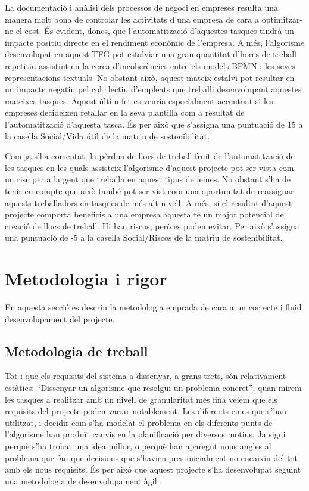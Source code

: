 La documentació i anàlisi dels processos de negoci en empreses resulta una manera molt bona de controlar les activitats d'una empresa de cara a optimitzar-ne el cost. És evident, doncs, que l'automatització d'aquestes tasques tindrà un impacte positiu directe en el rendiment econòmic de l'empresa. A més, l'algorisme desenvolupat en aquest TFG pot estalviar una gran quantitat d'hores de treball repetitiu assistint en la cerca d'incoherències entre els models BPMN i les seves representacions textuals. No obstant això, aquest mateix estalvi pot resultar en un impacte negatiu pel col·lectiu d'empleats que treballi desenvolupant aquestes mateixes tasques. Aquest últim fet es veuria especialment accentuat si les empreses decideixen retallar en la seva plantilla com a resultat de l'automatització d'aquesta tasca. És per això que s'assigna una puntuació de 15 a la casella Social/Vida útil de la matriu de sostenibilitat.

Com ja s'ha comentat, la pèrdua de llocs de treball fruit de l'automatització de les tasques en les quals assisteix l'algorisme d'aquest projecte pot ser vista com un risc per a la gent que treballa en aquest tipus de feines. No obstant s'ha de tenir en compte que això també pot ser vist com una oportunitat de reassignar aquests treballadors en tasques de més alt nivell. A més, si el resultat d'aquest projecte comporta beneficis a una empresa aquesta té un major potencial de creació de llocs de treball. Hi han riscos, però es poden evitar. Per això s'assigna una puntuació de -5 a la casella Social/Riscos de la matriu de sostenibilitat.

\section{Metodologia i rigor}

En aquesta secció es descriu la metodologia emprada de cara a un correcte i fluid desenvolupament del projecte. 

\subsection{Metodologia de treball}

Tot i que els requisits del sistema a dissenyar, a grans trets, són relativament estàtics: ``Dissenyar un algorisme que resolgui un problema concret'', quan mirem les tasques a realitzar amb un nivell de granularitat més fina veiem que els requisits del projecte poden variar notablement. Les diferents eines que s'han utilitzat, i decidir com s'ha modelat el problema en els diferents punts de l'algorisme han produït canvis en la planificació per diversos motius: Ja sigui perquè s'ha trobat una idea millor, o perquè han aparegut nous angles al problema que fan que decisions que s'havien pres inicialment no encaixin del tot amb els nous requisits. És per això que aquest projecte s'ha desenvolupat seguint una metodologia de desenvolupament àgil \cite{agile_manifesto}.

